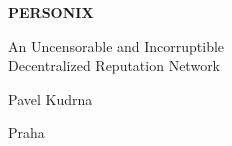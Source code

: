 \thispagestyle{empty}
\begin{center}
  {\sffamily\bfseries\fontsize{34}{40}\selectfont PERSONIX\par}
  \vspace{2.2em}
  {\rmfamily\large An Uncensorable and Incorruptible\\[0.25em]
   Decentralized Reputation Network\par}
\end{center}
\begin{center}
  {\rmfamily\Large Pavel Kudrna\par}
  \vspace{0.45em}
  {\rmfamily\small Praha\quad\textbullet{}\par}
\end{center}
\clearpage
